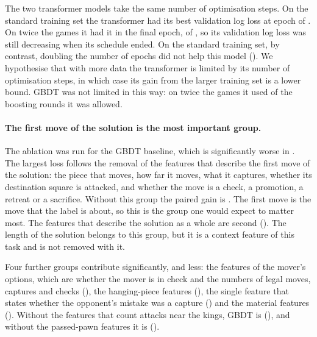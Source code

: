 \documentclass[11pt]{article}
\begin{document}
The two transformer models take the same number of optimisation steps. On
the standard training set the transformer had its best validation log loss
at epoch  of
. On twice the games it had it in the
final epoch,  of
, so its validation log loss
was still decreasing when its schedule ended.
\ifchangeepochs
On the standard training set, by contrast, doubling the number of epochs did
not help this model
().
\fi
We hypothesise that with more data the transformer is limited by its number
of optimisation steps, in which case its gain from the larger training set
is a lower bound. GBDT was not limited in this way: on twice the games it
used  of the  boosting
rounds it was allowed.
\fi



\iffeatures
\paragraph{The first move of the solution is the most important group.}
The ablation was run for the GBDT baseline, which is significantly worse in
. The largest loss follows the removal of
the features that describe the first move of the solution: the piece that
moves, how far it moves, what it captures, whether its destination square is
attacked, and whether the move is a check, a promotion, a retreat or a
sacrifice. Without this group the paired gain is
. The first move is the move
that the label is about, so this is the group one would expect to matter
most. The features that describe the solution as a whole are second
(). The length of the solution belongs
to this group, but it is a context feature of this task and is not removed
with it.

Four further groups contribute significantly, and less: the features of the
mover's options, which are whether the mover is in check and the numbers of
legal moves, captures and checks
(), the hanging-piece features
(), the single feature that states
whether the opponent's mistake was a capture
() and the material features
(). Without the features that
count attacks near the kings, GBDT is
(), and without the passed-pawn
features it is 
().
\end{document}
